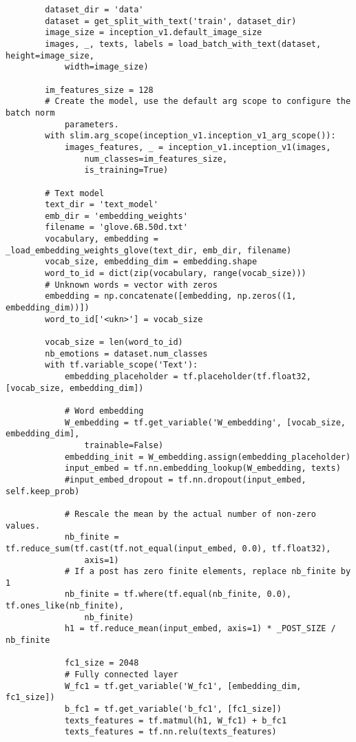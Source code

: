 \begin{lstlisting}
        dataset_dir = 'data'
        dataset = get_split_with_text('train', dataset_dir)
        image_size = inception_v1.default_image_size
        images, _, texts, labels = load_batch_with_text(dataset, height=image_size, 
            width=image_size)
        
        im_features_size = 128
        # Create the model, use the default arg scope to configure the batch norm 
            parameters.
        with slim.arg_scope(inception_v1.inception_v1_arg_scope()):
            images_features, _ = inception_v1.inception_v1(images, 
                num_classes=im_features_size, 
                is_training=True)

        # Text model
        text_dir = 'text_model'
        emb_dir = 'embedding_weights'
        filename = 'glove.6B.50d.txt'
        vocabulary, embedding = _load_embedding_weights_glove(text_dir, emb_dir, filename)
        vocab_size, embedding_dim = embedding.shape
        word_to_id = dict(zip(vocabulary, range(vocab_size)))
        # Unknown words = vector with zeros
        embedding = np.concatenate([embedding, np.zeros((1, embedding_dim))])
        word_to_id['<ukn>'] = vocab_size

        vocab_size = len(word_to_id)
        nb_emotions = dataset.num_classes
        with tf.variable_scope('Text'):
            embedding_placeholder = tf.placeholder(tf.float32, [vocab_size, embedding_dim])
        
            # Word embedding
            W_embedding = tf.get_variable('W_embedding', [vocab_size, embedding_dim], 
                trainable=False)
            embedding_init = W_embedding.assign(embedding_placeholder)
            input_embed = tf.nn.embedding_lookup(W_embedding, texts)
            #input_embed_dropout = tf.nn.dropout(input_embed, self.keep_prob)

            # Rescale the mean by the actual number of non-zero values.
            nb_finite = tf.reduce_sum(tf.cast(tf.not_equal(input_embed, 0.0), tf.float32), 
                axis=1)
            # If a post has zero finite elements, replace nb_finite by 1
            nb_finite = tf.where(tf.equal(nb_finite, 0.0), tf.ones_like(nb_finite), 
                nb_finite)
            h1 = tf.reduce_mean(input_embed, axis=1) * _POST_SIZE / nb_finite

            fc1_size = 2048
            # Fully connected layer
            W_fc1 = tf.get_variable('W_fc1', [embedding_dim, fc1_size])
            b_fc1 = tf.get_variable('b_fc1', [fc1_size])
            texts_features = tf.matmul(h1, W_fc1) + b_fc1
            texts_features = tf.nn.relu(texts_features)


\end{lstlisting}
